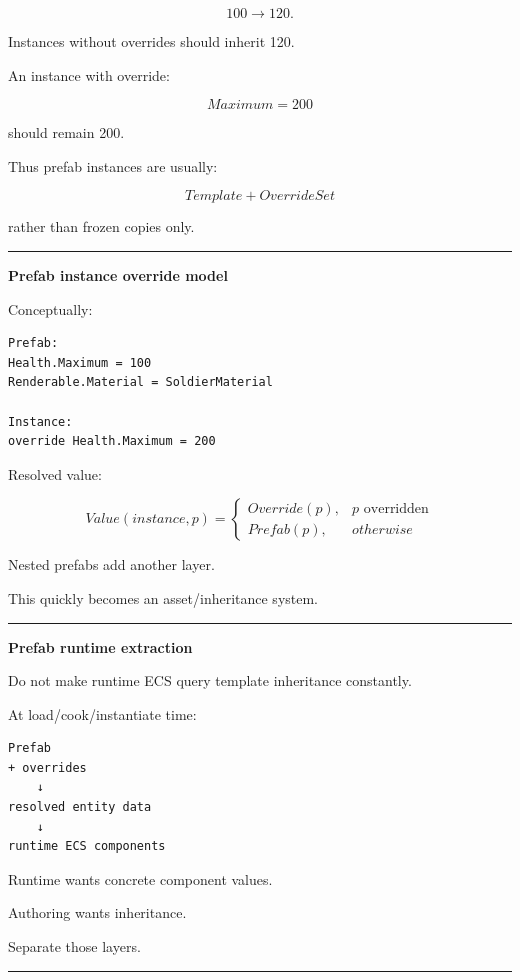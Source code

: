 \[
100\rightarrow120.
\]

Instances without overrides should inherit 120.

An instance with override:

\[
Maximum=200
\]

should remain 200.

Thus prefab instances are usually:

\[
\boxed{
Template
+
OverrideSet
}
\]

rather than frozen copies only.

\begin{center}\rule{0.5\linewidth}{0.5pt}\end{center}

\textbf{Prefab instance override model}

Conceptually:

\begin{verbatim}
Prefab:
Health.Maximum = 100
Renderable.Material = SoldierMaterial

Instance:
override Health.Maximum = 200
\end{verbatim}

Resolved value:

\[
Value(instance,p)=
\begin{cases}
Override(p),&p\text{ overridden}\\
Prefab(p),&otherwise
\end{cases}
\]

Nested prefabs add another layer.

This quickly becomes an asset/inheritance system.

\begin{center}\rule{0.5\linewidth}{0.5pt}\end{center}

\textbf{Prefab runtime extraction}

Do not make runtime ECS query template inheritance constantly.

At load/cook/instantiate time:

\begin{verbatim}
Prefab
+ overrides
    ↓
resolved entity data
    ↓
runtime ECS components
\end{verbatim}

Runtime wants concrete component values.

Authoring wants inheritance.

Separate those layers.

\begin{center}\rule{0.5\linewidth}{0.5pt}\end{center}

